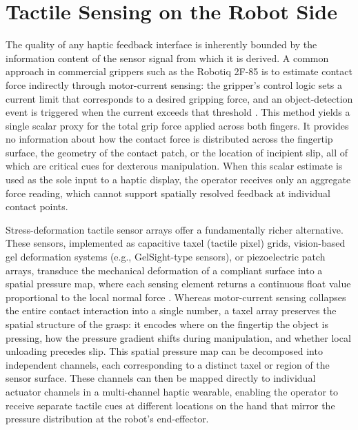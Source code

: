 \documentclass[12pt, a4paper]{report}
\begin{document}
\section{Tactile Sensing on the Robot Side}
The quality of any haptic feedback interface is inherently bounded by the information content of the sensor signal from which it is derived. A common approach in commercial grippers such as the Robotiq 2F-85 is to estimate contact force indirectly through motor-current sensing: the gripper's control logic sets a current limit that corresponds to a desired gripping force, and an object-detection event is triggered when the current exceeds that threshold \cite{robotiq_manual}. This method yields a single scalar proxy for the total grip force applied across both fingers. It provides no information about how the contact force is distributed across the fingertip surface, the geometry of the contact patch, or the location of incipient slip, all of which are critical cues for dexterous manipulation. When this scalar estimate is used as the sole input to a haptic display, the operator receives only an aggregate force reading, which cannot support spatially resolved feedback at individual contact points.

Stress-deformation tactile sensor arrays offer a fundamentally richer alternative. These sensors, implemented as capacitive taxel (tactile pixel) grids, vision-based gel deformation systems (e.g., GelSight-type sensors), or piezoelectric patch arrays, transduce the mechanical deformation of a compliant surface into a spatial pressure map, where each sensing element returns a continuous float value proportional to the local normal force \cite{lin2023}. Whereas motor-current sensing collapses the entire contact interaction into a single number, a taxel array preserves the spatial structure of the grasp: it encodes where on the fingertip the object is pressing, how the pressure gradient shifts during manipulation, and whether local unloading precedes slip. This spatial pressure map can be decomposed into independent channels, each corresponding to a distinct taxel or region of the sensor surface. These channels can then be mapped directly to individual actuator channels in a multi-channel haptic wearable, enabling the operator to receive separate tactile cues at different locations on the hand that mirror the pressure distribution at the robot's end-effector.
\end{document}
